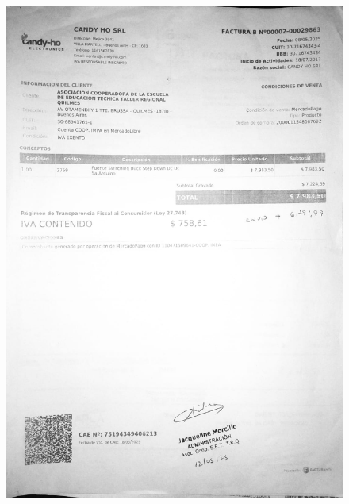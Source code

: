 \documentclass[12pt,a4paper]{article}
\begin{document}
\begin{figure}[H]
    \centering
    \includegraphics[width=1\linewidth]{Carpeta de campo/factura1.png}
\end{figure}
\end{document}

